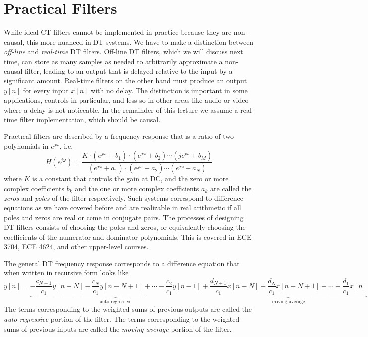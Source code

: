 \section{Practical Filters}

While ideal CT filters cannot be implemented in practice because they are non-causal, this more nuanced in DT systems. We have to make a distinction between \emph{off-line} and \emph{real-time} DT filters. Off-line DT filters, which we will discuss next time, can store as many samples as needed to arbitrarily approximate a non-causal filter, leading to an output that is delayed relative to the input by a significant amount. Real-time filters on the other hand must produce an output $y[n]$ for every input $x[n]$ with no delay. The distinction is important in some applications, controls in particular, and less so in other areas like audio or video where a delay is not noticeable. In the remainder of this lecture we assume a real-time filter implementation, which should be causal.

Practical filters are described by a frequency response that is a ratio of two polynomials in $e^{j\omega}$, i.e.
\[
H\left(e^{j\omega}\right) = \frac{K \cdot\left(e^{j\omega} + b_1\right)\cdot\left(e^{j\omega} + b_2\right)\cdots \left(je^{j\omega} + b_M\right)}{\left(e^{j\omega} + a_1\right)\cdot\left(e^{j\omega} + a_2\right)\cdots \left(e^{j\omega} + a_N\right)}
\]
where $K$ is a constant that controls the gain at DC, and the zero or more complex coefficients $b_k$ and the one or more complex coefficients $a_k$ are called the \emph{zeros} and \emph{poles} of the filter respectively. Such systems correspond to difference equations as we have covered before and are realizable in real arithmetic if all poles and zeros are real or come in conjugate pairs. The processes of designing DT filters consists of choosing the poles and zeros, or equivalently choosing the coefficients of the numerator and dominator polynomials. This is covered in ECE 3704, ECE 4624, and other upper-level courses. 

The general DT frequency response corresponds to a difference equation that when written in recursive form looks like
\[
y[n] = \underbrace{-\frac{c_{N+1}}{c_1} y[n-N] -\frac{c_{N}}{c_1}  y[n-N+1] + \cdots -\frac{c_{2}}{c_1} y[n-1]}_{\text{auto-regressive}} + \underbrace{\frac{d_{N+1}}{c_1} x[n-N] + \frac{d_{N}}{c_1} x[n-N+1] + \cdots + \frac{d_1}{c_1} x[n]}_{\text{moving-average}}
\]
The terms corresponding to the weighted sums of previous outputs are called the \emph{auto-regressive} portion of the filter. The terms corresponding to the weighted sums of previous inputs are called the \emph{moving-average} portion of the filter.

